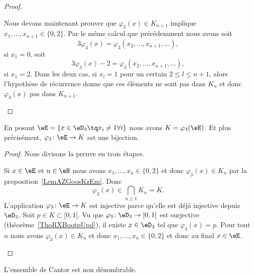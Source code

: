 \begin{proof}
\begin{subproof}

		Nous devons maintenant prouver que \( \varphi_3(x)\in K_{n+1}\) implique \( x_1,\ldots, x_{n+1}\in\{ 0,2 \}\). Par le même calcul que précédemment nous avons soit
		\begin{equation}
			3\varphi_3(x)=\varphi_3(x_2,\ldots, x_{n+1},\ldots),
		\end{equation}
		si \( x_1=0\), soit
		\begin{equation}
			3\varphi_3(x)-2=\varphi_3(x_2,\ldots, x_{n+1},\ldots),
		\end{equation}
		si \( x_1=2\). Dans les deux cas, si \( x_l=1\) pour un certain \( 2\leq l\leq n+1\), alors l'hypothèse de récurrence donne que ces éléments ne sont pas dans \( K_n\) et donc \( \varphi_3(x)\) pas dans \( K_{n+1}\).

	\end{subproof}
\end{proof}

\begin{corollary}   \label{CorSEDooJmeXt}
	En posant \( \eE=\{ x\in\eD_3\tq x_i\neq 1\forall i \}\) nous avons \( K=\varphi_3(\eE)\). Et plus précisément, \( \varphi_3\colon \eE\to K\) est une bijection.
\end{corollary}

\begin{proof}
	Nous divisons la preuve en trois étapes.
	\begin{subproof}
		Si \( x\in \eE\) et \( n\in \eN\) nous avons \( x_1,\ldots, x_n\in\{ 0,2 \}\) et donc \( \varphi_3(x)\in K_n\) par la proposition~\ref{LemAZGoosKzEm}. Donc
		\begin{equation}
			\varphi_3(x)\in\bigcap_{n\geq 1}K_n=K.
		\end{equation}
		\spitem[Injective]
		L'application \( \varphi_3\colon \eE\to K\) est injective parce qu'elle est déjà injective depuis \( \eD_3\).
		\spitem[Surjective]
		Soit \( p\in K\subset\mathopen[ 0 , 1 [\). Vu que \( \varphi_3\colon \eD_3\to \mathopen[ 0 , 1 [\) est surjective (théorème~\ref{ThoRXBootpUpd}), il existe \( x\in \eD_3\) tel que \( \varphi_3(x)=p\). Pour tout \( n\) nous avons \( \varphi_3(x)\in K_n\) et donc \( x_1,\ldots, x_n\in\{ 0,2 \}\) et donc au final \( x\in \eE\).
	\end{subproof}
\end{proof}

\begin{proposition}    \label{PropTPPooDySbm}
	L'ensemble de Cantor est non dénombrable.
\end{proposition}

